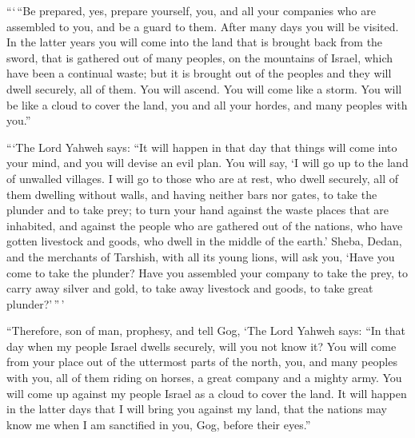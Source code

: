  ```\,``Be prepared, yes, prepare yourself, you, and all
your companies who are assembled to you, and be a guard to them.
 After many days you will be visited. In the latter years
you will come into the land that is brought back from the sword, that is
gathered out of many peoples, on the mountains of Israel, which have
been a continual waste; but it is brought out of the peoples and they
will dwell securely, all of them.  You will ascend. You will
come like a storm. You will be like a cloud to cover the land, you and
all your hordes, and many peoples with you.''

 ```The Lord Yahweh says: ``It will happen in that day that
things will come into your mind, and you will devise an evil plan.
 You will say, `I will go up to the land of unwalled
villages. I will go to those who are at rest, who dwell securely, all of
them dwelling without walls, and having neither bars nor gates,
 to take the plunder and to take prey; to turn your hand
against the waste places that are inhabited, and against the people who
are gathered out of the nations, who have gotten livestock and goods,
who dwell in the middle of the earth.'  Sheba, Dedan, and
the merchants of Tarshish, with all its young lions, will ask you, `Have
you come to take the plunder? Have you assembled your company to take
the prey, to carry away silver and gold, to take away livestock and
goods, to take great plunder?'\,''\,'

 ``Therefore, son of man, prophesy, and tell Gog, `The Lord
Yahweh says: ``In that day when my people Israel dwells securely, will
you not know it?  You will come from your place out of the
uttermost parts of the north, you, and many peoples with you, all of
them riding on horses, a great company and a mighty army. 
You will come up against my people Israel as a cloud to cover the land.
It will happen in the latter days that I will bring you against my land,
that the nations may know me when I am sanctified in you, Gog, before
their eyes.''

